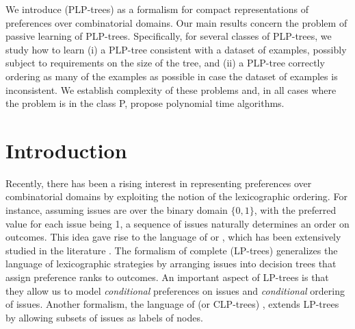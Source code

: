 We introduce  (PLP-trees) 
as a formalism for compact representations of preferences over 
combinatorial domains. Our main results concern the problem of passive 
learning of PLP-trees. Specifically, for several classes of 
PLP-trees, we study how to learn (i) a PLP-tree consistent with a 
dataset of examples, possibly subject to requirements on the size 
of the tree, and (ii) a PLP-tree correctly ordering as many of 
the examples as possible in case the dataset of examples is inconsistent. 
We establish complexity of these problems and, in all cases where the 
problem is in the class P, propose polynomial time algorithms.

\section{Introduction}

Recently, there has been a rising interest in representing
preferences over combinatorial domains by exploiting the notion of
the lexicographic ordering. For instance, assuming issues are over the  
binary domain $\{0,1\}$, with the preferred value for each issue being 
1, a sequence of issues naturally determines an order on outcomes.
This idea gave rise to the language of  or , which has been extensively 
studied in the literature \cite{schmitt2006complexity,dombi2007learning,%
yaman2008democratic}. The formalism of complete  (LP-trees) \cite{booth:learningLP} generalizes the
language of lexicographic strategies by arranging issues into 
decision trees that assign preference ranks to outcomes. An important
aspect of LP-trees is that they allow us to model \emph{conditional}
preferences on issues and \emph{conditional} ordering of issues. 
Another formalism,
the language of  (or 
CLP-trees) \cite{brauning2012learning}, extends LP-trees by allowing 
subsets of issues as labels of nodes.


